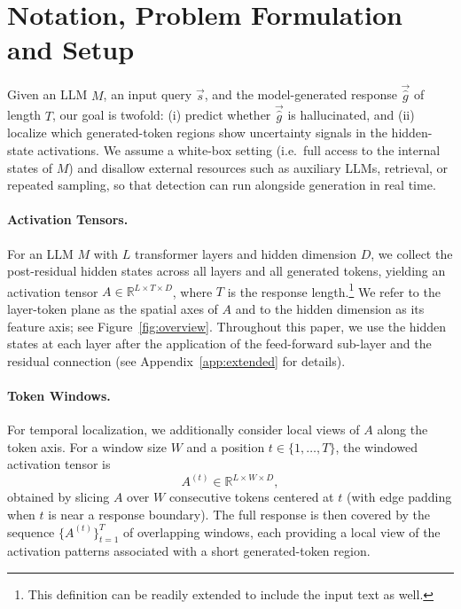 \section{Notation, Problem Formulation and Setup}
\label{sec:notation}

Given an LLM $M$, an input query $\vec{s}$, and the model-generated response
$\vec{\hat{g}}$ of length $T$, our goal is twofold: (i) predict whether
$\vec{\hat{g}}$ is hallucinated, and (ii) localize which generated-token
regions show uncertainty signals in the hidden-state activations. We assume
a white-box setting (i.e.\ full access to the internal states of $M$)
and disallow external resources such as auxiliary LLMs, retrieval, or
repeated sampling, so that detection can run alongside generation in real
time.

\paragraph{Activation Tensors.} For an LLM $M$ with $L$ transformer layers
and hidden dimension $D$, we collect the post-residual hidden states across
all layers and all generated tokens, yielding an activation tensor
$A \in \mathbb{R}^{L \times T \times D}$, where $T$ is the response
length.\footnote{This definition can be readily extended to include the
input text as well.} We refer to the layer-token plane as the spatial axes
of $A$ and to the hidden dimension as its feature axis; see
Figure~\ref{fig:overview}. Throughout this paper, we use the hidden states
at each layer after the application of the feed-forward sub-layer and the
residual connection (see Appendix~\ref{app:extended} for details).

\paragraph{Token Windows.} For temporal localization, we additionally
consider local views of $A$ along the token axis. For a window size $W$ and
a position $t \in \{1, \dots, T\}$, the windowed activation tensor is
\[
    A^{(t)} \in \mathbb{R}^{L \times W \times D},
\]
obtained by slicing $A$ over $W$ consecutive tokens centered at $t$ (with
edge padding when $t$ is near a response boundary). The full response is
then covered by the sequence $\{A^{(t)}\}_{t=1}^{T}$ of overlapping windows,
each providing a local view of the activation patterns associated with a
short generated-token region.

